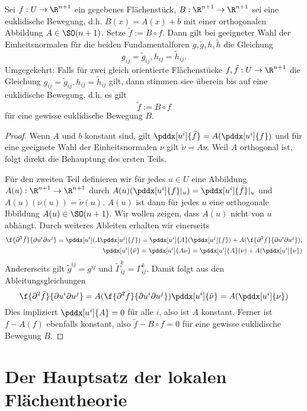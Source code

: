 \begin{lem}
	Sei $f: U \to \R^{n+1}$ ein gegebenes Flächenstück, $B: \R^{n+1} \to \R^{n+1}$ sei eine euklidische Bewegung, d.h. $B(x) = A(x) + b$ mit einer orthogonalen Abbildung $A \in \SO(n+1)$.
	Setze $\tilde f := B \circ f$.
	Dann gilt bei geeigneter Wahl der Einheitsnormalen für die beiden Fundamentalforen $g, \tilde g, h, \tilde h$ die Gleichung
	\[
		g_{ij} = \tilde g_{ij},
		h_{ij} = \tilde h_{ij}.
	\]
	Umgegekehrt: Falls für zwei gleich orientierte Flächenstücke $f, \tilde f: U \to \R^{n+1}$ die Gleichung $g_{ij} = \tilde g_{ij}, h_{ij} = \tilde h_{ij}$ gilt, dann stimmen siee überein bis auf eine euklidische Bewegung, d.h. es gilt
	\[
		\tilde f := B \circ f
	\]
	für eine gewisse euklidische Bewegung $B$.
	\begin{proof}
		Wenn $A$ und $b$ konstant sind, gilt $\pddx[u^i]{\tilde f} = A(\pddx[u^i]{f})$ und für eine geeignete Wahl der Einheitsnormalen $\nu$ gilt $\tilde \nu = A\nu$.
		Weil $A$ orthogonal ist, folgt direkt die Behauptung des ersten Teils.

		Für den zweiten Teil definieren wir für jedes $u \in U$ eine Abbildung $A(u): \R^{n+1} \to \R^{n+1}$ durch $A(u)(\pddx[u^i]{f}|_u) = \pddx[u^i]{\tilde f}|_u$ und $A(u)(\nu(u)) = \tilde \nu(u)$.
		$A(u)$ ist dann für jedes $u$ eine orthogonale Ibbildung $A(u) \in \SO(n+1)$.
		Wir wollen zeigen, dass $A(u)$ nicht von $u$ abhängt.
		Durch weiteres Ableiten erhalten wir einerseits
		\begin{align*}
			\f{\partial^2 \tilde f}{\partial u^i \partial u^j}
			= \pddx[u^i] (A \pddx[u^j]{f})
			= \pddx[u^i]{A} (\pddx[u^j]{f}) + A(\f{\partial^2 f}{\partial u^i \partial u^j}), \\
			\pddx[u^i]{\tilde \nu} = \pddx[u^i]{A\nu} = \pddx[u^i]{A}(\nu) + A (\pddx[u^i]{\nu})
		\end{align*}
		Andererseits gilt $\tilde g^{ij} = g^{ij}$ und $\tilde \Gamma_{ij}^k = \Gamma_{ij}^k$.
		Damit folgt aus den Ableitungsgleichungen
		\[
			\f{\partial^2 \tilde f}{\partial u^i \partial u^j}
			= A (\f{\partial^2 f}{\partial u^i \partial u^j})
			\pddx[u^i]{\tilde \nu} = A (\pddx[u^i]{\nu})
		\]
		Dies impliziert $\pddx[u^i]{A} = 0$ für alle $i$, also ist $A$ konstant.
		Ferner ist $f - A(f)$ ebenfalls konstant, also $\tilde f - B\circ f = 0$ für eine gewisse euklidische Bewegung $B$.
	\end{proof}
\end{lem}

\section{Der Hauptsatz der lokalen Flächentheorie}

